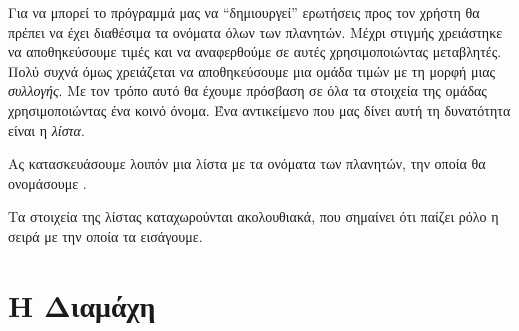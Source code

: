 \documentclass[a4paper,11pt,oneside]{book}
\begin{document}
Για να μπορεί το πρόγραμμά μας να ``δημιουργεί'' ερωτήσεις προς τον χρήστη θα πρέπει να έχει διαθέσιμα τα ονόματα όλων των πλανητών. Μέχρι στιγμής
χρειάστηκε να αποθηκεύσουμε τιμές και να αναφερθούμε σε αυτές χρησιμοποιώντας μεταβλητές. Πολύ συχνά όμως χρειάζεται να αποθηκεύσουμε μια ομάδα τιμών με τη μορφή μιας \emph{συλλογής}. Με τον τρόπο αυτό θα έχουμε πρόσβαση σε όλα τα στοιχεία της ομάδας χρησιμοποιώντας ένα κοινό όνομα. Ένα αντικείμενο που μας δίνει αυτή τη δυνατότητα είναι η \emph{λίστα}.

Ας κατασκευάσουμε λοιπόν μια λίστα με τα ονόματα των πλανητών, την οποία θα ονομάσουμε .


Τα στοιχεία της λίστας καταχωρούνται ακολουθιακά, που σημαίνει ότι παίζει ρόλο η σειρά με την οποία τα εισάγουμε. 

\clearpage
\section{Η Διαμάχη}
\end{document}
